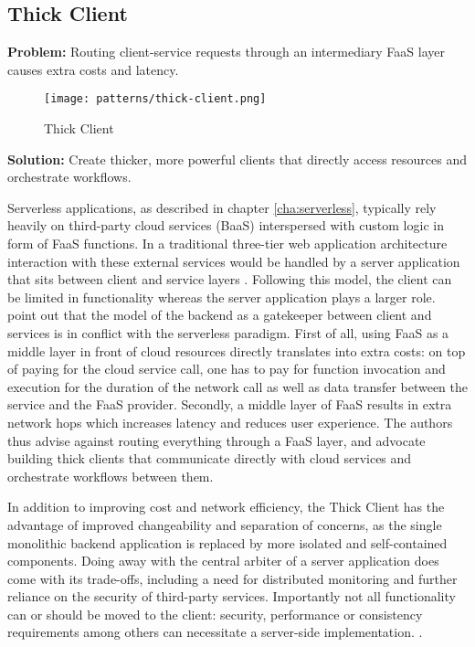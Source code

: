 \subsection{Thick Client} \label{subsec:thickClient}

\textbf{Problem:} Routing client-service requests through an intermediary FaaS layer causes extra costs and latency.

\begin{figure}[h]
  \centering
  \texttt{[image: patterns/thick-client.png]}
  \caption{Thick Client}
  \label{fig:patternThickClient}
\end{figure}

\textbf{Solution:} Create thicker, more powerful clients that directly access resources and orchestrate workflows.

Serverless applications, as described in chapter \ref{cha:serverless}, typically rely heavily on third-party cloud services (BaaS) interspersed with custom logic in form of FaaS functions. In a traditional three-tier web application architecture interaction with these external services would be handled by a server application that sits between client and service layers \parencite{robert2016serverlessarchitectures}. Following this model, the client can be limited in functionality whereas the server application plays a larger role. \textcite{sbarski2017serverless} point out that the model of the backend as a gatekeeper between client and services is in conflict with the serverless paradigm. First of all, using FaaS as a middle layer in front of cloud resources directly translates into extra costs: on top of paying for the cloud service call, one has to pay for function invocation and execution for the duration of the network call as well as data transfer between the service and the FaaS provider. Secondly, a middle layer of FaaS results in extra network hops which increases latency and reduces user experience. The authors thus advise against routing everything through a FaaS layer, and advocate building thick clients that communicate directly with cloud services and orchestrate workflows between them.

In addition to improving cost and network efficiency, the Thick Client has the advantage of improved changeability and separation of concerns, as the single monolithic backend application is replaced by more isolated and self-contained components. Doing away with the central arbiter of a server application does come with its trade-offs, including a need for distributed monitoring and further reliance on the security of third-party services. Importantly not all functionality can or should be moved to the client: security, performance or consistency requirements among others can necessitate a server-side implementation. \parencite{robert2016serverlessarchitectures}.

